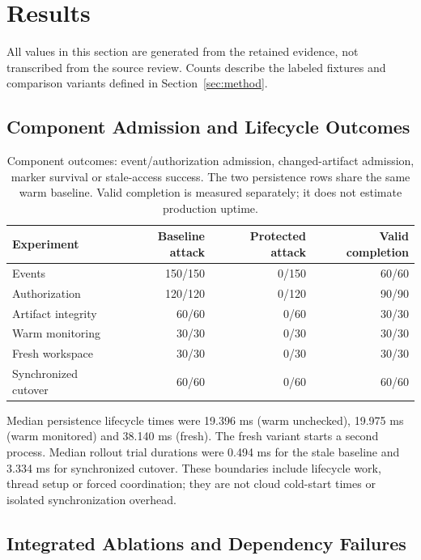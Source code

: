 \documentclass[11pt,a4paper]{article}
\begin{document}
\section{Results}\label{sec:results}



All values in this section are generated from the retained evidence, not transcribed from the source review. Counts describe the labeled fixtures and comparison variants defined in Section~\ref{sec:method}.



\subsection{Component Admission and Lifecycle Outcomes}

\begin{table}[htbp]
\centering\small
\begin{tabularx}{\linewidth}{@{}Yrrr@{}}
\toprule
Experiment & Baseline attack & Protected attack & Valid completion \\
\midrule
Events & 150/150 & 0/150 & 60/60 \\
Authorization & 120/120 & 0/120 & 90/90 \\
Artifact integrity & 60/60 & 0/60 & 30/30 \\
Warm monitoring & 30/30 & 0/30 & 30/30 \\
Fresh workspace & 30/30 & 0/30 & 30/30 \\
Synchronized cutover & 60/60 & 0/60 & 60/60 \\
\bottomrule
\end{tabularx}
\caption{Component outcomes: event/authorization admission, changed-artifact admission, marker survival or stale-access success. The two persistence rows share the same warm baseline. Valid completion is measured separately; it does not estimate production uptime.}\label{tab:components}
\end{table}


Median persistence lifecycle times were 19.396 ms (warm unchecked), 19.975 ms (warm monitored) and 38.140 ms (fresh). The fresh variant starts a second process. Median rollout trial durations were 0.494 ms for the stale baseline and 3.334 ms for synchronized cutover. These boundaries include lifecycle work, thread setup or forced coordination; they are not cloud cold-start times or isolated synchronization overhead.


\subsection{Integrated Ablations and Dependency Failures}
\end{document}
